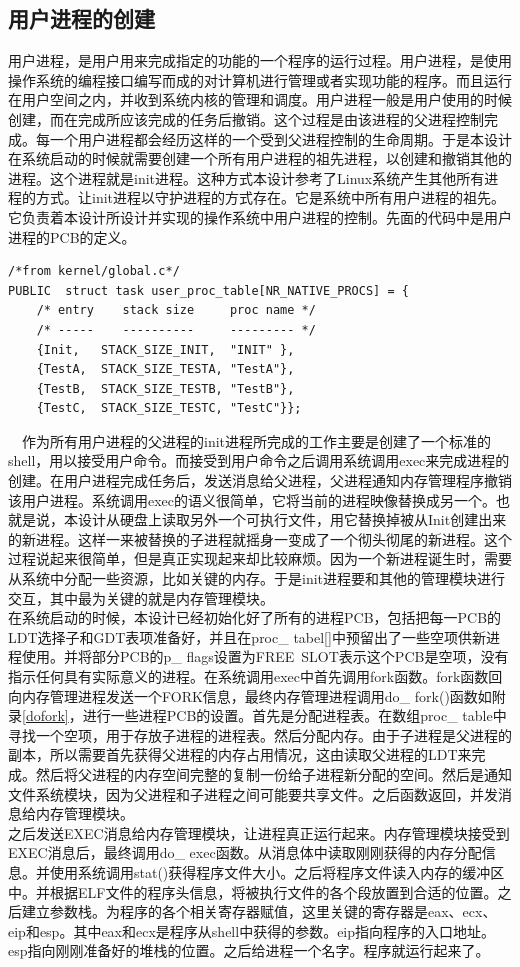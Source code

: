 \documentclass[UTF8,nofonts,cs4size]{ctexrep}
\begin{document}
\subsection{用户进程的创建}
用户进程，是用户用来完成指定的功能的一个程序的运行过程。用户进程，是使用操作系统的编程接口编写而成的对计算机进行管理或者实现功能的程序。而且运行在用户空间之内，并收到系统内核的管理和调度。用户进程一般是用户使用的时候创建，而在完成所应该完成的任务后撤销。这个过程是由该进程的父进程控制完成。每一个用户进程都会经历这样的一个受到父进程控制的生命周期。于是本设计在系统启动的时候就需要创建一个所有用户进程的祖先进程，以创建和撤销其他的进程。这个进程就是init进程。这种方式本设计参考了Linux系统产生其他所有进程的方式。让init进程以守护进程的方式存在。它是系统中所有用户进程的祖先。它负责着本设计所设计并实现的操作系统中用户进程的控制。先面的代码中是用户进程的PCB的定义。
\begin{lstlisting}
/*from kernel/global.c*/
PUBLIC	struct task	user_proc_table[NR_NATIVE_PROCS] = {
	/* entry    stack size     proc name */
	/* -----    ----------     --------- */
	{Init,   STACK_SIZE_INIT,  "INIT" },
	{TestA,  STACK_SIZE_TESTA, "TestA"},
	{TestB,  STACK_SIZE_TESTB, "TestB"},
	{TestC,  STACK_SIZE_TESTC, "TestC"}};
\end{lstlisting}
\indent \ \ 
作为所有用户进程的父进程的init进程所完成的工作主要是创建了一个标准的shell，用以接受用户命令。而接受到用户命令之后调用系统调用exec来完成进程的创建。在用户进程完成任务后，发送消息给父进程，父进程通知内存管理程序撤销该用户进程。系统调用exec的语义很简单，它将当前的进程映像替换成另一个。也就是说，本设计从硬盘上读取另外一个可执行文件，用它替换掉被从Init创建出来的新进程。这样一来被替换的子进程就摇身一变成了一个彻头彻尾的新进程。这个过程说起来很简单，但是真正实现起来却比较麻烦。因为一个新进程诞生时，需要从系统中分配一些资源，比如关键的内存。于是init进程要和其他的管理模块进行交互，其中最为关键的就是内存管理模块。
\\
\indent   在系统启动的时候，本设计已经初始化好了所有的进程PCB，包括把每一PCB的LDT选择子和GDT表项准备好，并且在proc\_ tabel[]中预留出了一些空项供新进程使用。并将部分PCB的p\_ flags设置为FREE\ SLOT表示这个PCB是空项，没有指示任何具有实际意义的进程。在系统调用exec中首先调用fork函数。fork函数回向内存管理进程发送一个FORK信息，最终内存管理进程调用do\_ fork()函数如附录\ref{dofork}，进行一些进程PCB的设置。首先是分配进程表。在数组proc\_ table中寻找一个空项，用于存放子进程的进程表。然后分配内存。由于子进程是父进程的副本，所以需要首先获得父进程的内存占用情况，这由读取父进程的LDT来完成。然后将父进程的内存空间完整的复制一份给子进程新分配的空间。然后是通知文件系统模块，因为父进程和子进程之间可能要共享文件。之后函数返回，并发消息给内存管理模块。
\\
\indent   之后发送EXEC消息给内存管理模块，让进程真正运行起来。内存管理模块接受到EXEC消息后，最终调用do\_ exec函数。从消息体中读取刚刚获得的内存分配信息。并使用系统调用stat()获得程序文件大小。之后将程序文件读入内存的缓冲区中。并根据ELF文件的程序头信息，将被执行文件的各个段放置到合适的位置。之后建立参数栈。为程序的各个相关寄存器赋值，这里关键的寄存器是eax、ecx、eip和esp。其中eax和ecx是程序从shell中获得的参数。eip指向程序的入口地址。esp指向刚刚准备好的堆栈的位置。之后给进程一个名字。程序就运行起来了。
\end{document}
